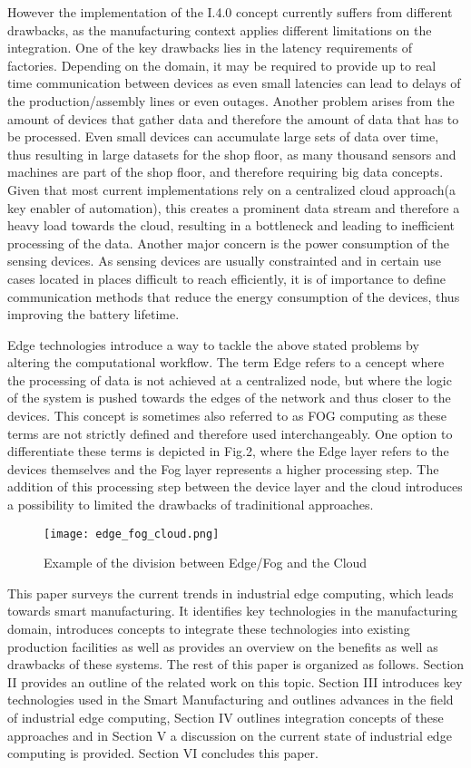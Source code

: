 However the implementation of the I.4.0 concept currently suffers from different drawbacks, as the manufacturing context applies different limitations on the integration. One of the key drawbacks lies in the latency requirements of factories. \cite{latency} Depending on the domain, it may be required to provide up to real time communication between devices as even small latencies can lead to delays of the production/assembly lines or even outages. Another problem arises from the amount of devices that gather data and therefore the amount of data that has to be processed. \cite{bigData} Even small devices can accumulate large sets of data over time, thus resulting in large datasets for the shop floor, as many thousand sensors and machines are part of the shop floor, and therefore requiring big data concepts. Given that most current implementations rely on a centralized cloud approach(a key enabler of automation), this creates a prominent data stream and therefore a heavy load towards the cloud, resulting in a bottleneck and leading to inefficient processing of the data. Another major concern is the power consumption of the sensing devices. \cite{fogDep} As sensing devices are usually constrainted and in certain use cases located in places difficult to reach efficiently, it is of importance to define communication methods that reduce the energy consumption of the devices, thus improving the battery lifetime.

Edge technologies introduce a way to tackle the above stated problems by altering the computational workflow. The term Edge refers to a cencept where the processing of data is not achieved at a centralized node, but where the logic of the system is pushed towards the edges of the network and thus closer to the devices. \cite{edgeDef} This concept is sometimes also referred to as FOG computing as these terms are not strictly defined and therefore used interchangeably. One option to differentiate these terms is depicted in Fig.2, where the Edge layer refers to the devices themselves and the Fog layer represents a higher processing step. The addition of this processing step between the device layer and the cloud introduces a possibility to limited the drawbacks of tradinitional approaches.

\begin{figure}
	\centering
	\texttt{[image: edge\_fog\_cloud.png]}
	\caption{Example of the division between Edge/Fog and the Cloud}
\end{figure}

This paper surveys the current trends in industrial edge computing, which leads towards smart manufacturing. It identifies key technologies in the manufacturing domain, introduces concepts to integrate these technologies into existing production facilities as well as provides an overview on the benefits as well as drawbacks of these systems. The rest of this paper is organized as follows. Section II provides an outline of the related work on this topic. Section III introduces key technologies used in the Smart Manufacturing and outlines advances in the field of industrial edge computing, Section IV outlines integration concepts of these approaches and in Section V a discussion on the current state of industrial edge computing is provided. Section VI concludes this paper.
